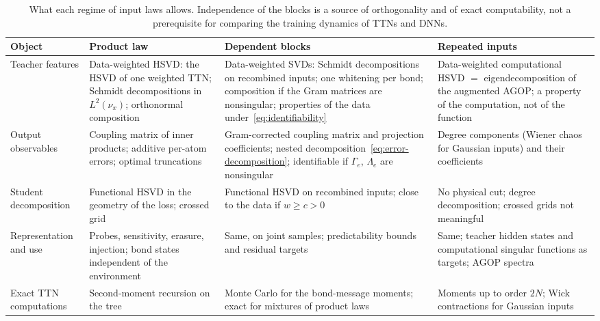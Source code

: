 \documentclass[11pt]{article}
\theoremstyle{definition}
\numberwithin{equation}{section}
\begin{document}
\begin{table}[t]
\centering
\footnotesize
\renewcommand{\arraystretch}{1.25}
\begin{tabular}{p{}p{}p{}p{}}
\hline
\raggedright Object & \raggedright Product law & \raggedright Dependent blocks & \raggedright Repeated inputs \tabularnewline
\hline
\raggedright Teacher features & \raggedright Data-weighted HSVD: the HSVD of one weighted TTN; Schmidt decompositions in $L^2(\nu_x)$; orthonormal composition & \raggedright Data-weighted SVDs: Schmidt decompositions on recombined inputs; one whitening per bond; composition if the Gram matrices are nonsingular; properties of the data under~\eqref{eq:identifiability} & \raggedright Data-weighted computational HSVD $=$ eigendecomposition of the augmented AGOP; a property of the computation, not of the function \tabularnewline
\raggedright Output observables & \raggedright Coupling matrix of inner products; additive per-atom errors; optimal truncations & \raggedright Gram-corrected coupling matrix and projection coefficients; nested decomposition~\eqref{eq:error-decomposition}; identifiable if $\Gamma_e$, $\Lambda_e$ are nonsingular & \raggedright Degree components (Wiener chaos for Gaussian inputs) and their coefficients \tabularnewline
\raggedright Student decomposition & \raggedright Functional HSVD in the geometry of the loss; crossed grid & \raggedright Functional HSVD on recombined inputs; close to the data if $w\ge c>0$ & \raggedright No physical cut; degree decomposition; crossed grids not meaningful \tabularnewline
\raggedright Representation and use & \raggedright Probes, sensitivity, erasure, injection; bond states independent of the environment & \raggedright Same, on joint samples; predictability bounds and residual targets & \raggedright Same; teacher hidden states and computational singular functions as targets; AGOP spectra \tabularnewline
\raggedright Exact TTN computations & \raggedright Second-moment recursion on the tree & \raggedright Monte Carlo for the bond-message moments; exact for mixtures of product laws & \raggedright Moments up to order $2N$; Wick contractions for Gaussian inputs \tabularnewline
\hline
\end{tabular}
\caption{What each regime of input laws allows. Independence of the blocks is a source of orthogonality and of exact computability, not a prerequisite for comparing the training dynamics of TTNs and DNNs.}
\label{tab:regimes}
\end{table}
\end{document}
